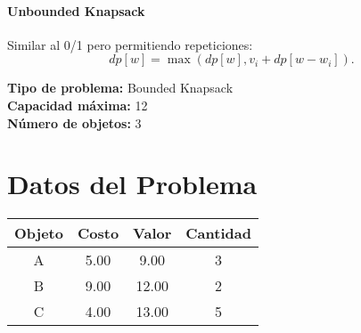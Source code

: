 \documentclass{article}
\begin{document}
\paragraph{Unbounded Knapsack} Similar al 0/1 pero permitiendo repeticiones:
\[
dp[w] = \max ( dp[w], v_i + dp[w - w_i] ).
\]

\thispagestyle{empty}
\newpage
\textbf{Tipo de problema:} Bounded Knapsack\\
\textbf{Capacidad máxima:} 12\\
\textbf{Número de objetos:} 3\\

\section*{Datos del Problema}
\begin{tabular}{|c|c|c|c|}
\hline
Objeto & Costo & Valor & Cantidad \\
\hline
A & 5.00 & 9.00 & 3 \\
B & 9.00 & 12.00 & 2 \\
C & 4.00 & 13.00 & 5 \\
\hline
\end{tabular}
\end{document}
